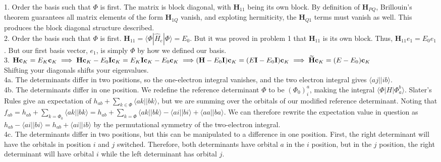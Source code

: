 \documentclass{article}
\begin{document}
1. Order the basis such that $\Phi$ is first. The matrix is block diagonal, with $\mathbf{H}_{11}$ being its own block. By definition of $\mathbf{H}_{PQ}$, Brillouin's theorem guarantees all matrix elements of the form $\mathbf{H}_{1Q}$ vanish, and exploting hermiticity, the $\mathbf{H}_{Q1}$ terms must vanish as well. This produces the block diagonal structure described.\\

2. Order the basis such that $\Phi$ is first. $\mathbf{H}_{11} = \langle \Phi | \hat{H}_e | \Phi \rangle = E_0$. But it was proved in problem 1 that $\mathbf{H}_{11}$ is its own block. Thus, $\mathbf{H}_{11} e_1 = E_0 e_1$. But our first basis vector, $e_1$, is simply $\Phi$ by how we defined our basis.\\

3. $\mathbf{Hc}_K = E_K\mathbf{c}_K \implies \mathbf{Hc}_K - E_0\mathbf{Ic}_K = E_K\mathbf{Ic}_K - E_0\mathbf{c}_K \implies\\
(\mathbf{H}-E_0\mathbf{I})\mathbf{c}_K = (E\mathbf{I}-E_0\mathbf{I})\mathbf{c}_K \implies \widetilde{\mathbf{H}}\mathbf{c}_K = (E-E_0)\mathbf{c}_K$\\

Shifting your diagonals shifts your eigenvalues.\\

4a. The determinants differ in two positions, so the one-electron integral vanishes, and the two electron integral gives $\langle aj || ib \rangle$.\\
4b. The determinants differ in one position. We redefine the reference determinant $\Phi$ to be $(\Phi_0)_i^a$, making the integral $\langle \Phi | H | \Phi_a^b \rangle$. Slater's Rules give an expectation of $h_{ab}+\sum\limits_{k \in \Phi} \langle ak || bk \rangle $, but we are summing over the orbitals of our modified reference determinant. Noting that $f_{ab} = h_{ab} + \sum\limits_{k=\Phi_0} \langle ak || bk \rangle = h_{ab} + \sum\limits_{k=\Phi} \langle ak || bk \rangle - \langle ai || bi \rangle + \langle aa || ba \rangle$. We can therefore rewrite the expectation value in question as $h_{ab} - \langle ai || bi\rangle = h_{ab} + \langle ai || ib\rangle$ by the permutational symmetry of the two-electron integral.\\
4c. The determinants differ in two positions, but this can be manipulated to a difference in one position. First, the right determinant will have the orbitals in position $i$ and $j$ switched. Therefore, both determinants have orbital $a$ in the $i$ position, but in the $j$ position, the right determinant will have orbital $i$ while the left determinant has orbital $j$.
\end{document}
